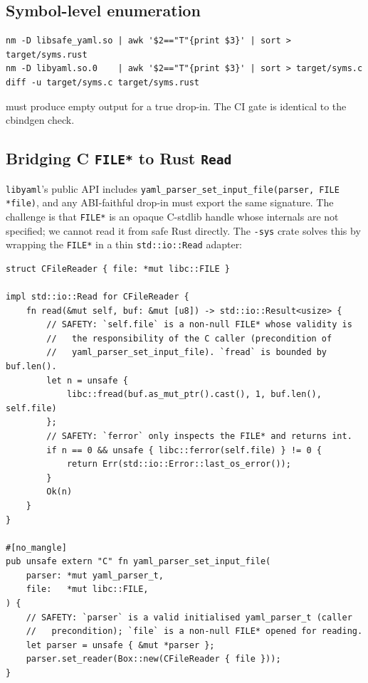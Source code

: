 \documentclass[12pt]{article}
\theoremstyle{definition}
\theoremstyle{remark}
\begin{document}
\subsection{Symbol-level enumeration}

\begin{lstlisting}[language={}]
nm -D libsafe_yaml.so | awk '$2=="T"{print $3}' | sort > target/syms.rust
nm -D libyaml.so.0    | awk '$2=="T"{print $3}' | sort > target/syms.c
diff -u target/syms.c target/syms.rust
\end{lstlisting}
must produce empty output for a true drop-in. The CI gate is identical to
the cbindgen check.

\subsection{Bridging C \texttt{FILE*} to Rust \texttt{Read}}
\label{sec:ffi-file}

\texttt{libyaml}'s public API includes
\texttt{yaml\_parser\_set\_input\_file(parser, FILE *file)}, and any
ABI-faithful drop-in must export the same signature. The challenge is
that \texttt{FILE*} is an opaque C-stdlib handle whose internals are not
specified; we cannot read it from safe Rust directly. The \texttt{-sys}
crate solves this by wrapping the \texttt{FILE*} in a thin
\texttt{std::io::Read} adapter:

\begin{lstlisting}
struct CFileReader { file: *mut libc::FILE }

impl std::io::Read for CFileReader {
    fn read(&mut self, buf: &mut [u8]) -> std::io::Result<usize> {
        // SAFETY: `self.file` is a non-null FILE* whose validity is
        //   the responsibility of the C caller (precondition of
        //   yaml_parser_set_input_file). `fread` is bounded by buf.len().
        let n = unsafe {
            libc::fread(buf.as_mut_ptr().cast(), 1, buf.len(), self.file)
        };
        // SAFETY: `ferror` only inspects the FILE* and returns int.
        if n == 0 && unsafe { libc::ferror(self.file) } != 0 {
            return Err(std::io::Error::last_os_error());
        }
        Ok(n)
    }
}

#[no_mangle]
pub unsafe extern "C" fn yaml_parser_set_input_file(
    parser: *mut yaml_parser_t,
    file:   *mut libc::FILE,
) {
    // SAFETY: `parser` is a valid initialised yaml_parser_t (caller
    //   precondition); `file` is a non-null FILE* opened for reading.
    let parser = unsafe { &mut *parser };
    parser.set_reader(Box::new(CFileReader { file }));
}
\end{lstlisting}
\end{document}
